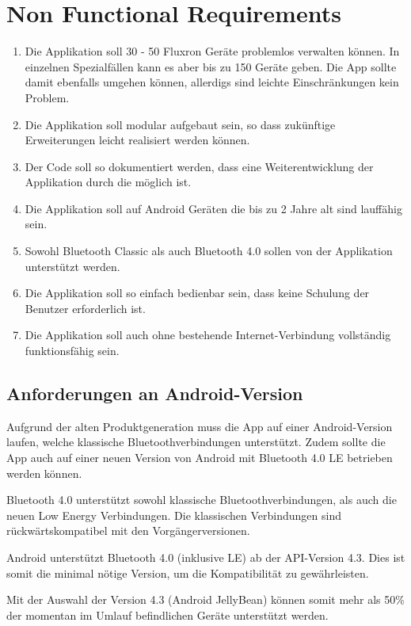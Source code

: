 
\section{Non Functional Requirements}
\label{sec:Non Functional Requirements}

\begin{enumerate}
\item Die Applikation soll 30 - 50 Fluxron Geräte problemlos verwalten können. In einzelnen Spezialfällen kann es aber bis zu 150 Geräte geben. Die App sollte damit ebenfalls umgehen können, allerdigs sind leichte Einschränkungen kein Problem.
\item Die Applikation soll modular aufgebaut sein, so dass zukünftige Erweiterungen leicht realisiert werden können.
\item Der Code soll so dokumentiert werden, dass eine Weiterentwicklung der Applikation durch die \fluxron{} möglich ist.
\item Die Applikation soll auf Android Geräten die bis zu 2 Jahre alt sind lauffähig sein.
\item Sowohl Bluetooth Classic als auch Bluetooth 4.0 sollen von der Applikation unterstützt werden.
\item Die Applikation soll so einfach bedienbar sein, dass keine Schulung der Benutzer erforderlich ist.
\item Die Applikation soll auch ohne bestehende Internet-Verbindung vollständig funktionsfähig sein.
\end{enumerate}


\subsection{Anforderungen an Android-Version}
\label{subsec:Non Functional Requirements}
Aufgrund der alten Produktgeneration muss die App auf einer Android-Version laufen, welche klassische Bluetoothverbindungen unterstützt. Zudem sollte die App auch auf einer neuen Version von Android mit Bluetooth 4.0 \ac{LE} betrieben werden können.

Bluetooth 4.0 unterstützt sowohl klassische Bluetoothverbindungen, als auch die neuen Low Energy Verbindungen. Die klassischen Verbindungen sind rückwärtskompatibel mit den Vorgängerversionen.\cite{bt_standard}

Android unterstützt Bluetooth 4.0 (inklusive \ac{LE}) ab der API-Version 4.3\cite{bt_android}. Dies ist somit die minimal nötige Version, um die Kompatibilität zu gewährleisten.

Mit der Auswahl der Version 4.3 (Android JellyBean) können somit mehr als 50\% der momentan im Umlauf \cite{android_distribution} befindlichen Geräte unterstützt werden.